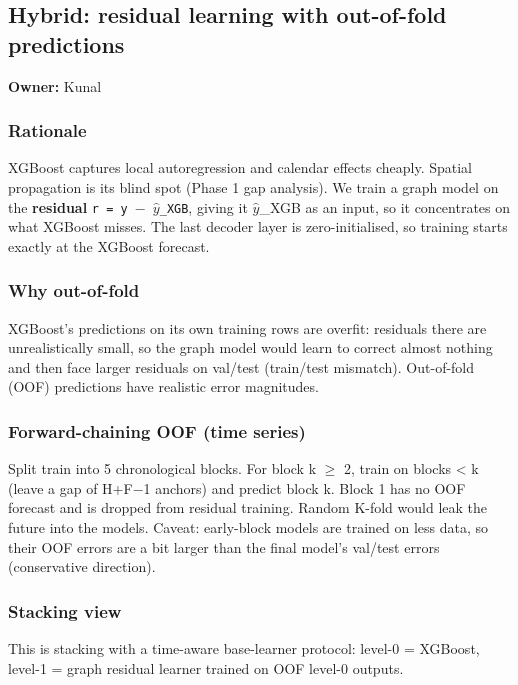 \documentclass[10pt,a4paper]{article}
\begin{document}
\subsection*{Hybrid: residual learning with out-of-fold predictions}
\textbf{Owner:} Kunal

\subsubsection*{Rationale}
XGBoost captures local autoregression and calendar effects cheaply. Spatial propagation is its blind spot (Phase 1 gap analysis). We train a graph model on the \textbf{residual} \texttt{r = y \ensuremath{-} \ensuremath{\hat{y}}\_\allowbreak{}XGB}, giving it \ensuremath{\hat{y}}\_\allowbreak{}XGB as an input, so it concentrates on what XGBoost misses. The last decoder layer is zero-initialised, so training starts exactly at the XGBoost forecast.

\subsubsection*{Why out-of-fold}
XGBoost's predictions on its own training rows are overfit: residuals there are unrealistically small, so the graph model would learn to correct almost nothing and then face larger residuals on val/\allowbreak{}test (train/\allowbreak{}test mismatch). Out-of-fold (OOF) predictions have realistic error magnitudes.

\subsubsection*{Forward-chaining OOF (time series)}
Split train into 5 chronological blocks. For block k \ensuremath{\geq} 2, train on blocks < k (leave a gap of H+F\ensuremath{-}1 anchors) and predict block k. Block 1 has no OOF forecast and is dropped from residual training. Random K-fold would leak the future into the models. Caveat: early-block models are trained on less data, so their OOF errors are a bit larger than the final model's val/\allowbreak{}test errors (conservative direction).

\subsubsection*{Stacking view}
This is stacking with a time-aware base-learner protocol: level-0 = XGBoost, level-1 = graph residual learner trained on OOF level-0 outputs.
\end{document}
